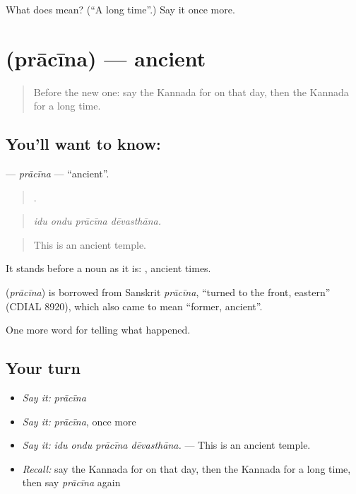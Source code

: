 \begin{tcolorbox}[breakable,colback=teal!4,colframe=teal!35!black,title={Before you move on}]
What does  mean? (\textquotedblleft{}A long time\textquotedblright{}.) Say it once more.
\end{tcolorbox}
\section[\texorpdfstring{\kn{ಪ್ರಾಚೀನ} (prācīna)}{ಪ್ರಾಚೀನ (prācīna)}]{ (prācīna) — ancient}

\label{lesson:KA-C331-pracina}



\begin{quote}
Before the new one: say the Kannada for on that day, then the Kannada for a long time.
\end{quote}

\subsection*{You'll want to know: }
\textbf{} — \emph{prācīna} — \textquotedblleft{}ancient\textquotedblright{}.

\begin{quote}
   .
\end{quote}

\begin{quote}
\emph{idu ondu prācīna dēvasthāna.}
\end{quote}

\begin{quote}
This is an ancient temple.
\end{quote}

It stands before a noun as it is:  , ancient times.

\begin{cousinweb}
\textbf{} (\emph{prācīna}) is borrowed from Sanskrit \emph{prācīna}, \textquotedblleft{}turned to the front, eastern\textquotedblright{} (CDIAL 8920), which also came to mean \textquotedblleft{}former, ancient\textquotedblright{}.
\end{cousinweb}

\begin{grammarlens}[title={What you've built}]
One more word for telling what happened.
\end{grammarlens}

\subsection*{Your turn}
\begin{itemize}
\raggedright
  \item \emph{Say it:} \emph{prācīna}
  \item \emph{Say it:} \emph{prācīna}, once more
  \item \emph{Say it:} \emph{idu ondu prācīna dēvasthāna.} — This is an ancient temple.
  \item \emph{Recall:} say the Kannada for on that day, then the Kannada for a long time, then say \emph{prācīna} again
\end{itemize}

